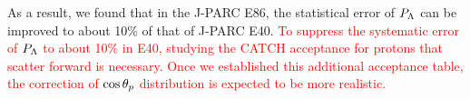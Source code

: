 As a result, we found that in the J-PARC E86, the statistical error of $P_{\Lambda}$ can be improved to about 10\% of that of J-PARC E40. \textcolor{red}{ To suppress the systematic error of $P_{\Lambda}$ to about 10\% in E40, studying the CATCH acceptance for protons that scatter forward is necessary. Once we established this additional acceptance table, the correction of $\cos{\theta_p}$ distribution is expected to be more realistic. }
 
%
